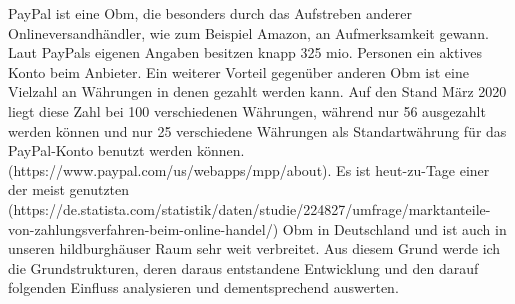 PayPal ist eine \ac{Obm}, die besonders durch das Aufstreben anderer Onlineversandhändler, wie zum Beispiel Amazon, an Aufmerksamkeit gewann. Laut PayPals eigenen Angaben besitzen knapp 325 mio. Personen ein aktives Konto beim Anbieter. Ein weiterer Vorteil gegenüber anderen \ac{Obm} ist eine Vielzahl an Währungen in denen gezahlt werden kann. Auf den Stand März 2020 liegt diese Zahl bei 100 verschiedenen Währungen, während nur 56 ausgezahlt werden können und nur 25 verschiedene Währungen als Standartwährung für das PayPal-Konto benutzt werden können. (https://www.paypal.com/us/webapps/mpp/about).   
Es ist heut-zu-Tage einer der meist genutzten (https://de.statista.com/statistik/daten/studie/224827/umfrage/marktanteile-von-zahlungsverfahren-beim-online-handel/) \ac{Obm} in Deutschland und ist auch in unseren hildburghäuser Raum sehr weit verbreitet. Aus diesem Grund werde ich die Grundstrukturen, deren daraus entstandene Entwicklung und den darauf folgenden Einfluss analysieren und dementsprechend auswerten.


\cite[S. 30]{toni}
